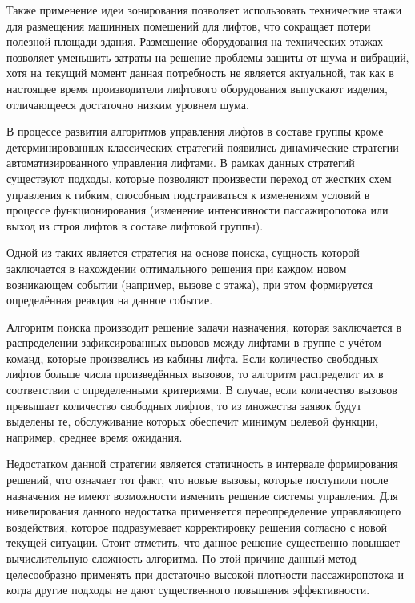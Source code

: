 	Также применение идеи зонирования позволяет использовать технические этажи
		для размещения машинных помещений для лифтов, что сокращает потери полезной площади здания.
		Размещение оборудования на технических этажах позволяет уменьшить
		затраты на решение проблемы защиты от шума и вибраций,
		хотя на текущий момент данная потребность не является актуальной,
		так как в настоящее время производители лифтового оборудования выпускают изделия,
		отличающееся достаточно низким уровнем шума.

	В процессе развития алгоритмов управления лифтов в составе группы кроме детерминированных
		классических стратегий появились динамические стратегии автоматизированного управления лифтами.
		В рамках данных стратегий существуют подходы, которые позволяют произвести переход
		от жестких схем управления к гибким, способным подстраиваться к изменениям условий в процессе
		функционирования (изменение интенсивности пассажиропотока или выход из строя лифтов
		в составе лифтовой группы).
	
	Одной из таких является стратегия на основе поиска,
		сущность которой заключается в нахождении оптимального решения при каждом новом возникающем
		событии (например, вызове с этажа), при этом формируется определённая реакция на данное событие.

	Алгоритм поиска производит решение задачи назначения,
		которая заключается в распределении зафиксированных вызовов между лифтами в группе с учётом команд,
		которые произвелись из кабины лифта. Если количество свободных лифтов больше числа произведённых вызовов,
		то алгоритм распределит их в соответствии с определенными критериями.
		В случае, если количество вызовов превышает количество свободных лифтов,
		то из множества заявок будут выделены те, обслуживание которых обеспечит минимум целевой функции,
		например, среднее время ожидания.
		
	Недостатком данной стратегии является статичность в интервале формирования решений,
		что означает тот факт, что новые вызовы, которые поступили после назначения
		не имеют возможности изменить решение системы управления.
		Для нивелирования данного недостатка применяется переопределение управляющего воздействия,
		которое подразумевает корректировку решения согласно с новой текущей ситуации.
		Стоит отметить, что данное решение существенно повышает вычислительную сложность алгоритма.
		По этой причине данный метод целесообразно применять при достаточно высокой плотности
		пассажиропотока и когда другие подходы не дают существенного повышения эффективности.

